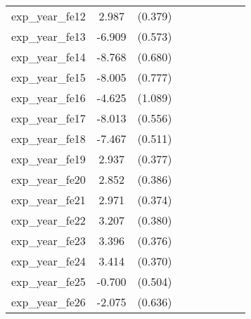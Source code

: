 {\begin{tabular}{l*{4}{cc}}
exp\_year\_fe12&    2.987\sym{***}&  (0.379)&                  &         &                  &         &                  &         \\
exp\_year\_fe13&   -6.909\sym{***}&  (0.573)&                  &         &                  &         &                  &         \\
exp\_year\_fe14&   -8.768\sym{***}&  (0.680)&                  &         &                  &         &                  &         \\
exp\_year\_fe15&   -8.005\sym{***}&  (0.777)&                  &         &                  &         &                  &         \\
exp\_year\_fe16&   -4.625\sym{***}&  (1.089)&                  &         &                  &         &                  &         \\
exp\_year\_fe17&   -8.013\sym{***}&  (0.556)&                  &         &                  &         &                  &         \\
exp\_year\_fe18&   -7.467\sym{***}&  (0.511)&                  &         &                  &         &                  &         \\
exp\_year\_fe19&    2.937\sym{***}&  (0.377)&                  &         &                  &         &                  &         \\
exp\_year\_fe20&    2.852\sym{***}&  (0.386)&                  &         &                  &         &                  &         \\
exp\_year\_fe21&    2.971\sym{***}&  (0.374)&                  &         &                  &         &                  &         \\
exp\_year\_fe22&    3.207\sym{***}&  (0.380)&                  &         &                  &         &                  &         \\
exp\_year\_fe23&    3.396\sym{***}&  (0.376)&                  &         &                  &         &                  &         \\
exp\_year\_fe24&    3.414\sym{***}&  (0.370)&                  &         &                  &         &                  &         \\
exp\_year\_fe25&   -0.700         &  (0.504)&                  &         &                  &         &                  &         \\
exp\_year\_fe26&   -2.075\sym{**} &  (0.636)&                  &         &                  &         &                  &         \\

\end{tabular}}
